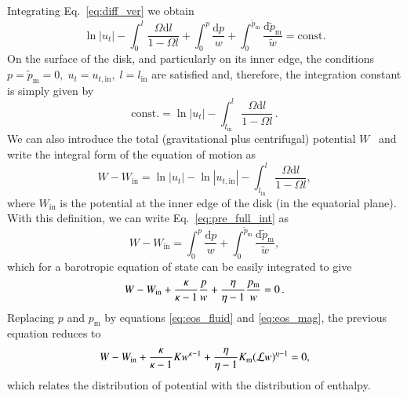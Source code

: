 \documentclass{aa}
\begin{document}
Integrating Eq.~\eqref{eq:diff_ver} we obtain
\begin{equation}\label{eq:pre_full_int}
\ln |u_t| - \int^l_0 \frac{\Omega \mathrm{d}l}{1 - \Omega l} + \int^p_0 \frac{\mathrm{d}p}{w} + \int_0^{\tilde{p}_{\mathrm{m}}} \frac{\mathrm{d}\tilde{p}_{\mathrm{m}}}{\tilde{w}} = \mathrm{const}.
\end{equation}
On the surface of the disk, and particularly on its inner edge, the conditions
$p = \tilde{p}_{\mathrm{m}} = 0, \; u_t = u_{t, \mathrm{in}}, \; l = l_{\mathrm{in}}$
are satisfied and, therefore, the integration constant is simply given by
\begin{equation}
\mathrm{const.} = \ln |u_t| - \int^l_{l_\mathrm{in}} \frac{\Omega \mathrm{d}l}{1 - \Omega l}\,.
\end{equation}
We can also introduce the total (gravitational plus centrifugal) potential $W$~\citep{Abramowicz:1978} and write the integral form of the equation of motion as
\begin{equation}\label{eq:potential}
W - W_{\mathrm{in}} = \ln|u_t| - \ln|u_{t,\mathrm{in}}| - \int^{l}_{l_{\mathrm{in}}} \frac{\Omega \mathrm{d}l}{1 - \Omega l},
\end{equation}
where $W_{\mathrm{in}}$ is the potential at the inner edge of the disk (in the equatorial plane). With this definition, we can write Eq.~\eqref{eq:pre_full_int} as
\begin{equation}\label{eq:full_int}
W - W_{\mathrm{in}} = \int^p_0 \frac{\mathrm{d}p}{w} + \int_0^{\tilde{p}_{\mathrm{m}}} \frac{\mathrm{d}\tilde{p}_{\mathrm{m}}}{\tilde{w}},
\end{equation}
which for a barotropic equation of state can be easily integrated to give
\begin{equation}\label{eq:pre_enthalpy_eq}
W - W_{\rm{in}} + \frac{\kappa}{\kappa - 1}\frac{p}{w} + \frac{\eta}{\eta - 1}\frac{p_{\mathrm{m}}}{w} = 0\,.
\end{equation}
Replacing $p$ and $p_{\mathrm{m}}$ by equations \eqref{eq:eos_fluid} and \eqref{eq:eos_mag}, the previous equation reduces to
\begin{equation}\label{eq:enthalpy_eq}
W - W_{\rm{in}} + \frac{\kappa}{\kappa - 1} K w^{\kappa - 1} + \frac{\eta}{\eta - 1}K_{\mathrm{m}}(\mathcal{L} w)^{\eta - 1} = 0,
\end{equation}
which relates the distribution of potential with the distribution of enthalpy.

\end{document}
